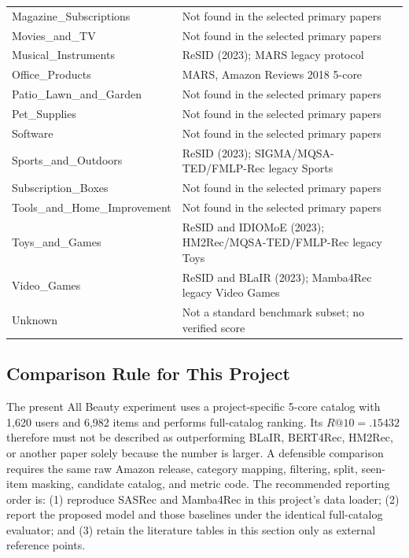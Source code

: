 \begin{longtable}{@{}p{}p{}@{}}
Magazine\_Subscriptions & Not found in the selected primary papers \\
Movies\_and\_TV & Not found in the selected primary papers \\
Musical\_Instruments & ReSID (2023); MARS legacy protocol \\
Office\_Products & MARS, Amazon Reviews 2018 5-core \\
Patio\_Lawn\_and\_Garden & Not found in the selected primary papers \\
Pet\_Supplies & Not found in the selected primary papers \\
Software & Not found in the selected primary papers \\
Sports\_and\_Outdoors & ReSID (2023); SIGMA/MQSA-TED/FMLP-Rec legacy Sports \\
Subscription\_Boxes & Not found in the selected primary papers \\
Tools\_and\_Home\_Improvement & Not found in the selected primary papers \\
Toys\_and\_Games & ReSID and IDIOMoE (2023); HM2Rec/MQSA-TED/FMLP-Rec legacy Toys \\
Video\_Games & ReSID and BLaIR (2023); Mamba4Rec legacy Video Games \\
Unknown & Not a standard benchmark subset; no verified score \\
\bottomrule
\end{longtable}

\subsection{Comparison Rule for This Project}

The present All Beauty experiment uses a project-specific 5-core catalog with
1,620 users and 6,982 items and performs full-catalog ranking. Its
$R@10=.15432$ therefore must not be described as outperforming BLaIR,
BERT4Rec, HM2Rec, or another paper solely because the number is larger. A
defensible comparison requires the same raw Amazon release, category mapping,
filtering, split, seen-item masking, candidate catalog, and metric code. The
recommended reporting order is: (1) reproduce SASRec and Mamba4Rec in this
project's data loader; (2) report the proposed model and those baselines under
the identical full-catalog evaluator; and (3) retain the literature tables in
this section only as external reference points.

